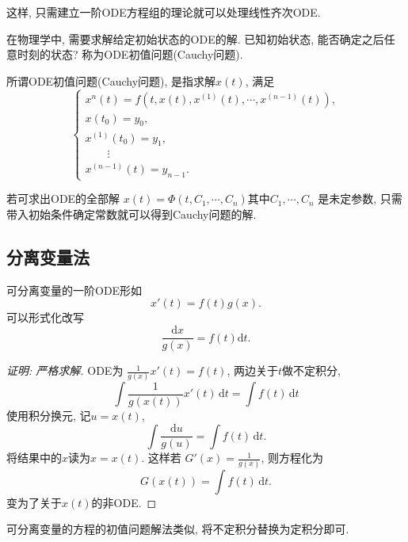 这样, 只需建立一阶ODE方程组的理论就可以处理线性齐次ODE.

在物理学中, 需要求解给定初始状态的ODE的解. 已知初始状态, 能否确定之后任意时刻的状态? 称为ODE初值问题(Cauchy问题).

\begin{definition}
  所谓ODE初值问题(Cauchy问题), 是指求解$x(t)$, 满足
  \begin{equation}
    \begin{cases}
      x^{n}(t) = f(t, x(t), x^{(1)}(t), \cdots , x^{(n-1)}(t)), \\
      x(t_0) = y_0, \\
      x^{(1)} (t_0) = y_1, \\
      \qquad \vdots \\
      x^{(n-1)}(t) = y_{n-1}.
    \end{cases}
  \end{equation}
\end{definition}
若可求出ODE的全部解 $x(t) = \Phi \left( t, C_1,\cdots , C_n \right)$其中$C_1,\cdots ,C_{n}$ 是未定参数, 只需带入初始条件确定常数就可以得到Cauchy问题的解.

\subsection{分离变量法}
可分离变量的一阶ODE形如
\begin{equation}
  x' (t) = f(t) g(x).
\end{equation}
可以形式化改写
\begin{equation}
  \frac{\mathrm{d} x}{g(x)} = f(t) \mathrm{d} t.
\end{equation}

\begin{proof}[证明: 严格求解]
  ODE为 $\frac{1}{g(x)} x' (t) = f(t)$, 两边关于$t$做不定积分,
  \begin{equation}
    \int \frac{1}{g(x(t))} x' (t) \, \mathrm{d} t = \int f(t) \, \mathrm{d} t
  \end{equation}
  使用积分换元, 记$u = x(t)$,
  \begin{equation}
    \int \frac{\mathrm{d} u}{g(u)} = \int f(t) \, \mathrm{d} t.
  \end{equation}
  将结果中的$x$读为$x=x(t)$. 这样若 $G'(x) = \frac{1}{g(x)}$, 则方程化为
  \begin{equation}
    G(x(t)) = \int f(t) \, \mathrm{d} t.
  \end{equation}
  变为了关于$x(t)$的非ODE.
\end{proof}
可分离变量的方程的初值问题解法类似, 将不定积分替换为定积分即可.


